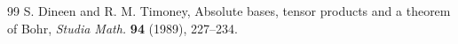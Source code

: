 \documentclass[a4paper,12pt]{amsart}
\theoremstyle{definition}
\begin{document}
\begin{thebibliography}{99}
	 {\sc S. Dineen} and {\sc R. M. Timoney}, Absolute bases, tensor products and a theorem of Bohr, \textit{Studia Math.} \textbf{94} (1989), 227--234.
	
	
	
	
	
	
	
	
	
	
	
	
	
	

\end{thebibliography}
\end{document}
